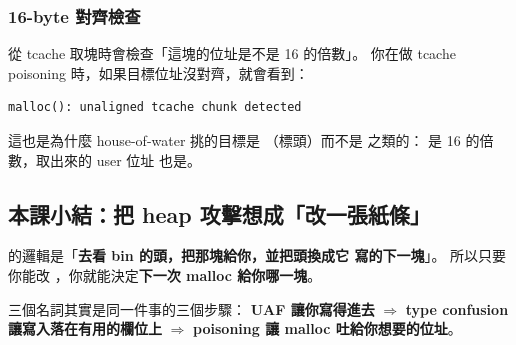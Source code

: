 \subsubsection{16-byte 對齊檢查}

 從 tcache 取塊時會檢查「這塊的位址是不是 16 的倍數」。
你在做 tcache poisoning 時，如果目標位址沒對齊，就會看到：

\begin{lstlisting}[style=raw]
malloc(): unaligned tcache chunk detected
\end{lstlisting}

\begin{warnbox}
這也是為什麼 house-of-water 挑的目標是 （標頭）而不是  之類的：
 是 16 的倍數，取出來的 user 位址  也是。
\end{warnbox}

\subsection{本課小結：把 heap 攻擊想成「改一張紙條」}

\begin{keybox}[一句話]
 的邏輯是「\textbf{去看 bin 的頭，把那塊給你，並把頭換成它  寫的下一塊}」。
所以只要你能改 ，你就能決定\textbf{下一次 malloc 給你哪一塊}。

三個名詞其實是同一件事的三個步驟：
\textbf{UAF 讓你寫得進去} $\Rightarrow$ \textbf{type confusion 讓寫入落在有用的欄位上}
$\Rightarrow$ \textbf{poisoning 讓 malloc 吐給你想要的位址}。
\end{keybox}
